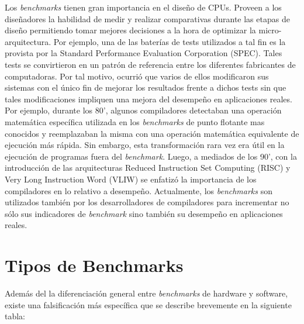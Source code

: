 Los \textit{benchmarks} tienen gran importancia en el diseño de
CPUs. Proveen a los diseñadores la habilidad de medir y realizar
comparativas durante las etapas de diseño permitiendo tomar mejores
decisiones a la hora de optimizar la micro-arquitectura. Por ejemplo,
una de las baterías de tests utilizados a tal fin es la provista por
la Standard Performance Evaluation Corporation (SPEC). Tales tests se
convirtieron en un patrón de referencia entre los diferentes
fabricantes de computadoras. Por tal motivo, ocurrió que varios de
ellos modificaron sus sistemas con el único fin de mejorar los
resultados frente a dichos tests sin que tales modificaciones
impliquen una mejora del desempeño en aplicaciones reales. Por
ejemplo, durante los 80', algunos compiladores detectaban una
operación matemática específica utilizada en los \textit{benchmarks}
de punto flotante mas conocidos y reemplazaban la misma con una
operación matemática equivalente de ejecución más rápida. Sin embargo,
esta transformación rara vez era útil en la ejecución de programas
fuera del \textit{benchmark}. Luego, a mediados de los 90', con la
introducción de las arquitecturas Reduced Instruction Set Computing
(RISC) y Very Long Instruction Word (VLIW) se enfatizó la importancia
de los compiladores en lo relativo a desempeño. Actualmente, los
\textit{benchmarks} son utilizados también por los desarrolladores de
compiladores para incrementar no sólo sus indicadores de
\textit{benchmark} sino también su desempeño en aplicaciones
reales. 



\section{Tipos de Benchmarks}

Además del la diferenciación general entre \textit{benchmarks} de
hardware y software, existe una falsificación más específica que se
describe brevemente en la siguiente tabla:

